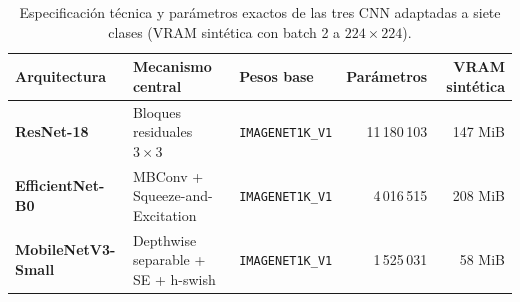 \begin{table}[htbp]\centering\small
\setlength{\tabcolsep}{6pt}
\caption{Especificación técnica y parámetros exactos de las tres CNN adaptadas a siete clases (VRAM sintética con batch 2 a $224\times 224$).}
\begin{tabularx}{\textwidth}{l>{\raggedright\arraybackslash}Xlrr}\toprule
\textbf{Arquitectura} & \textbf{Mecanismo central} & \textbf{Pesos base} & \textbf{Parámetros} & \textbf{VRAM sintética} \\ \midrule
\textbf{ResNet-18} & Bloques residuales $3\times 3$ & \texttt{IMAGENET1K\_V1} & 11\,180\,103 & 147 MiB \\
\textbf{EfficientNet-B0} & MBConv + Squeeze-and-Excitation & \texttt{IMAGENET1K\_V1} & 4\,016\,515 & 208 MiB \\
\textbf{MobileNetV3-Small} & Depthwise separable + SE + h-swish & \texttt{IMAGENET1K\_V1} & 1\,525\,031 & 58 MiB \\
\bottomrule\end{tabularx}\end{table}
